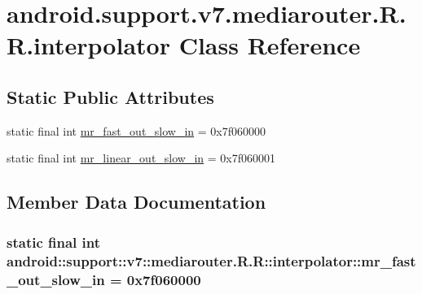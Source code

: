 \hypertarget{classandroid_1_1support_1_1v7_1_1mediarouter_1_1_r_1_1interpolator}{
\section{android.support.v7.mediarouter.R.R.interpolator Class Reference}
\label{classandroid_1_1support_1_1v7_1_1mediarouter_1_1_r_1_1interpolator}
}
\subsection*{Static Public Attributes}
\begin{CompactItemize}
\item 
static final int \hyperlink{classandroid_1_1support_1_1v7_1_1mediarouter_1_1_r_1_1interpolator_9f56f0dbf142d10650ec67e6a4458016}{mr\_\-fast\_\-out\_\-slow\_\-in} = 0x7f060000
\item 
static final int \hyperlink{classandroid_1_1support_1_1v7_1_1mediarouter_1_1_r_1_1interpolator_d6dcf5456dad60546ea359d790ac11d5}{mr\_\-linear\_\-out\_\-slow\_\-in} = 0x7f060001
\end{CompactItemize}


\subsection{Member Data Documentation}
\hypertarget{classandroid_1_1support_1_1v7_1_1mediarouter_1_1_r_1_1interpolator_9f56f0dbf142d10650ec67e6a4458016}{
\subsubsection[{mr\_\-fast\_\-out\_\-slow\_\-in}]{\setlength{\rightskip}{0pt plus 5cm}static final int android::support::v7::mediarouter.R.R::interpolator::mr\_\-fast\_\-out\_\-slow\_\-in = 0x7f060000}}
\label{classandroid_1_1support_1_1v7_1_1mediarouter_1_1_r_1_1interpolator_9f56f0dbf142d10650ec67e6a4458016}


